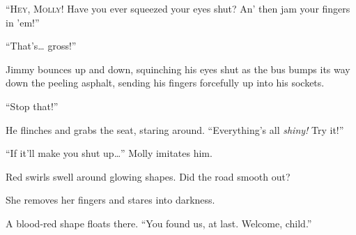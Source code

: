 
\lettrine{``H}{ey, Molly!} Have you ever squeezed your eyes shut? An' then jam your
fingers in 'em!''

``That's\ldots{} gross!''

Jimmy bounces up and down, squinching his eyes shut as the bus bumps its
way down the peeling asphalt, sending his fingers forcefully up into his
sockets.

``Stop that!''

He flinches and grabs the seat, staring around. ``Everything's all
\emph{shiny!} Try it!''

``If it'll make you shut up\ldots{}'' Molly imitates him.

Red swirls swell around glowing shapes. Did the road smooth out?

She removes her fingers and stares into darkness.

A blood-red shape floats there. ``You found us, at last. Welcome,
child.''
